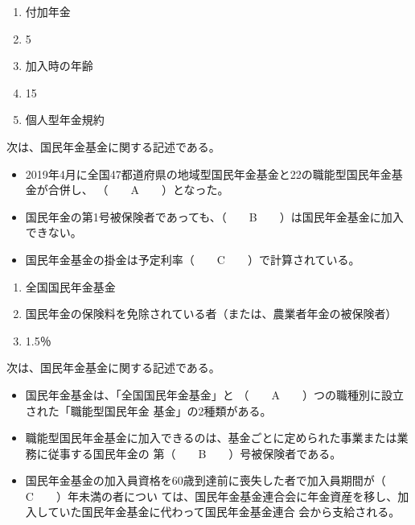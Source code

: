\begin{answerbox}
  \begin{enumerate}[A:]
    \item 付加年金
    \item 5
    \item 加入時の年齢
    \item 15
    \item 個人型年金規約
  \end{enumerate}
\end{answerbox}

\begin{fillblank}[数理人試験 2019 問題1 設問6 A,E,F]
  次は、国民年金基金に関する記述である。
  \begin{itemize}
    \item 2019年4月に全国47都道府県の地域型国民年金基金と22の職能型国民年金基金が合併し、
（　　A　　）となった。
    \item 国民年金の第1号被保険者であっても、（　　B　　）は国民年金基金に加入できない。
    \item 国民年金基金の掛金は予定利率（　　C　　）で計算されている。
  \end{itemize}

\end{fillblank}

\begin{answerbox}
  \begin{enumerate}[A:]
    \item 全国国民年金基金
    \item 国民年金の保険料を免除されている者（または、農業者年金の被保険者）
    \item 1.5％
  \end{enumerate}
\end{answerbox}


\begin{fillblank}[数理人試験 2024 問題1 設問5 A,B,E]
  次は、国民年金基金に関する記述である。
  \begin{itemize}
    \item 国民年金基金は、「全国国民年金基金」と （　　A　　）つの職種別に設立された「職能型国民年金
基金」の2種類がある。
\item 職能型国民年金基金に加入できるのは、基金ごとに定められた事業または業務に従事する国民年金の
第（　　B　　）号被保険者である。
\item 国民年金基金の加入員資格を60歳到達前に喪失した者で加入員期間が（　　C　　）年未満の者につい
ては、国民年金基金連合会に年金資産を移し、加入していた国民年金基金に代わって国民年金基金連合
会から支給される。
  \end{itemize}
\end{fillblank}

